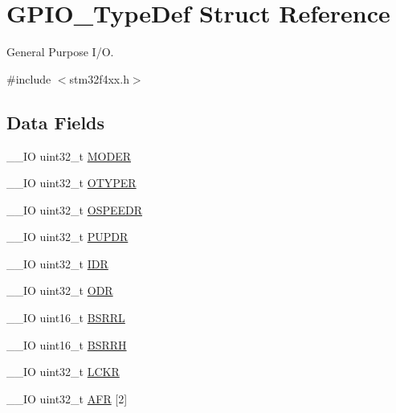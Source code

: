 \hypertarget{struct_g_p_i_o___type_def}{\section{G\-P\-I\-O\-\_\-\-Type\-Def Struct Reference}
\label{struct_g_p_i_o___type_def}
}


General Purpose I/\-O.  




{\ttfamily \#include $<$stm32f4xx.\-h$>$}

\subsection*{Data Fields}
\begin{DoxyCompactItemize}
\item 
\-\_\-\-\_\-\-I\-O uint32\-\_\-t \hyperlink{struct_g_p_i_o___type_def_a2b671a94c63a612f81e0e9de8152d01c}{M\-O\-D\-E\-R}
\item 
\-\_\-\-\_\-\-I\-O uint32\-\_\-t \hyperlink{struct_g_p_i_o___type_def_a9543592bda60cb5261075594bdeedac9}{O\-T\-Y\-P\-E\-R}
\item 
\-\_\-\-\_\-\-I\-O uint32\-\_\-t \hyperlink{struct_g_p_i_o___type_def_a328d16cc6213783ede54e4059ffd50a3}{O\-S\-P\-E\-E\-D\-R}
\item 
\-\_\-\-\_\-\-I\-O uint32\-\_\-t \hyperlink{struct_g_p_i_o___type_def_abeed38529bd7b8de082e490e5d4f1727}{P\-U\-P\-D\-R}
\item 
\-\_\-\-\_\-\-I\-O uint32\-\_\-t \hyperlink{struct_g_p_i_o___type_def_a328d2fe9ef1d513c3a97d30f98f0047c}{I\-D\-R}
\item 
\-\_\-\-\_\-\-I\-O uint32\-\_\-t \hyperlink{struct_g_p_i_o___type_def_abff7fffd2b5a718715a130006590c75c}{O\-D\-R}
\item 
\-\_\-\-\_\-\-I\-O uint16\-\_\-t \hyperlink{struct_g_p_i_o___type_def_aa79204c9bcc8c481da0a5ffe7c74d8b0}{B\-S\-R\-R\-L}
\item 
\-\_\-\-\_\-\-I\-O uint16\-\_\-t \hyperlink{struct_g_p_i_o___type_def_a35f89f65edca7ed58738166424aeef48}{B\-S\-R\-R\-H}
\item 
\-\_\-\-\_\-\-I\-O uint32\-\_\-t \hyperlink{struct_g_p_i_o___type_def_a2612a0f4b3fbdbb6293f6dc70105e190}{L\-C\-K\-R}
\item 
\-\_\-\-\_\-\-I\-O uint32\-\_\-t \hyperlink{struct_g_p_i_o___type_def_ab67c1158c04450d19ad483dcd2192e43}{A\-F\-R} \mbox{[}2\mbox{]}
\end{DoxyCompactItemize}


